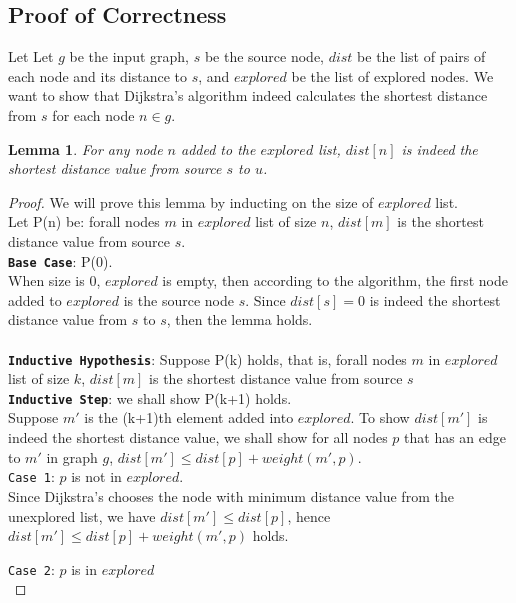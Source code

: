 \documentclass[11pt, oneside]{article}   	%
\newtheorem*{lemma}{Lemma}
\begin{document}
\subsection{Proof of Correctness}
Let Let $g$ be the input graph, $s$ be the source node, $dist$ be the list of pairs of each node and its distance to $s$, and $explored$ be the list of explored nodes. We want to show that Dijkstra's algorithm indeed calculates the shortest distance from $s$ for each node $n \in g$. 

\begin{lemma}
For any node $n$ added to the $explored$ list, $dist[n]$ is indeed the shortest distance value from source $s$ to $u$. 
\end{lemma}

\begin{proof}
We will prove this lemma by inducting on the size of $explored$ list. \\
Let P(n) be: forall nodes $m$ in $explored$ list of size $n$, $dist[m]$ is the shortest distance value from source $s$. \\
\textbf{\texttt{Base Case}}: P(0). 
\\
When size is 0, $explored$ is empty, then according to the algorithm, the first node added to $explored$ is the source node $s$. Since $dist[s] = 0$ is indeed the shortest distance value from $s$ to $s$, then the lemma holds. \\\\
\textbf{\texttt{Inductive Hypothesis}}: Suppose P(k) holds, that is, forall nodes $m$ in $explored$ list of size $k$, $dist[m]$ is the shortest distance value from source $s$
\\
\textbf{\texttt{Inductive Step}}: we shall show P(k+1) holds. 
\\
Suppose $m'$ is the (k+1)th element added into $explored$. To show $dist[m']$ is indeed the shortest distance value, we shall show for all nodes $p$ that has an edge to $m'$ in graph $g$, $dist[m'] \leq dist[p] + weight(m', p)$. 
\\
\texttt{Case 1}: $p$ is not in $explored$. \\
Since Dijkstra's chooses the node with minimum distance value from the unexplored list, we have $dist[m'] \leq dist[p]$, hence $dist[m'] \leq dist[p] + weight(m', p)$ holds. 

\texttt{Case 2}: $p$ is in $explored$\\

\end{proof}
\end{document}
